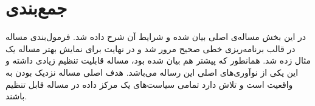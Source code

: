 \section{جمع‌بندی}

در این بخش مساله‌ی اصلی بیان شده و شرایط آن شرح داده شد.
فرمول‌بندی مساله در قالب برنامه‌ریزی خطی صحیح مرور شد و در نهایت برای نمایش بهتر مساله یک مثال زده شد.
همانطور که پیشتر هم بیان شده بود، مساله قابلیت تنظیم زیادی داشته و این یکی از نوآوری‌های اصلی این رساله می‌باشد.
هدف اصلی مساله نزدیک بودن به واقعیت است و تلاش دارد تمامی سیاست‌های یک مرکز داده‌ در مساله قابل تنظیم باشند.